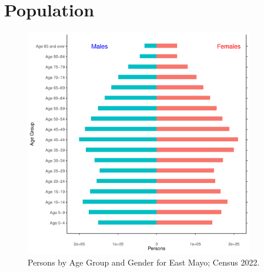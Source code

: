 \documentclass{article}
\begin{document}
\pagebreak

\section{Population} 
\label{sect:Pop}

\begin{figure}[h]
	\centering
	\includegraphics[width = 100mm]{../figures/PyramidPlot.pdf}
	\caption{Persons by Age Group and Gender for East Mayo; Census 2022.}
	\label{fig:2ae19629-1a6a-13a3-e055-000000000001}
	\end{figure}
\end{document}
